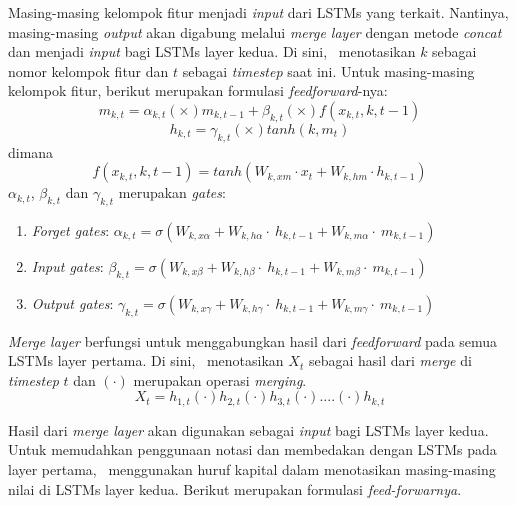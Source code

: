 \begin{enumerate}
	Masing-masing kelompok fitur menjadi \textit{input} dari LSTMs yang terkait. Nantinya, masing-masing \textit{output} akan digabung melalui \textit{merge layer} dengan metode \textit{concat} dan menjadi \textit{input} bagi LSTMs layer kedua.
	Di sini, \saya~menotasikan $ k $ sebagai nomor kelompok fitur dan $ t $ sebagai \textit{timestep} saat ini. Untuk masing-masing kelompok fitur, berikut merupakan formulasi \textit{feedforward}-nya:
	\begin{equation}\label{eq:mt2}
	m_{k,t}=\alpha_{k,t} (\times) m_{k,t-1} + \beta_{k,t} (\times) f(x_{k,t},{k,t-1})
	\end{equation}
	\begin{equation}\label{eq:ht2}
	h_{k,t}=\gamma_{k,t} (\times) tanh(k,m_{t})
	\end{equation}
	dimana
	\begin{equation}\label{eq:hf2}
	f(x_{k,t},{k,t-1})=tanh(W_{k,xm} \cdot x_{t} + W_{k,hm} \cdot h_{k,t-1})
	\end{equation}
	$ \alpha_{k,t} $, $ \beta_{k,t} $ dan $ \gamma_{k,t} $ merupakan \textit{gates}:
	\begin{enumerate}
	\item \textit{Forget gates}: $ \alpha_{k,t}=\sigma(W_{k,x\alpha}+W_{k,h\alpha}\cdot~h_{k,t-1}+W_{k,m\alpha}\cdot~m_{k,t-1}) $
	\item \textit{Input gates}: $ \beta_{k,t}=\sigma(W_{k,x\beta}+W_{k,h\beta}\cdot~h_{k,t-1}+W_{k,m\beta}\cdot~m_{k,t-1}) $
	\item \textit{Output gates}: $ \gamma_{k,t}=\sigma(W_{k,x\gamma}+W_{k,h\gamma}\cdot~h_{k,t-1}+W_{k,m\gamma}\cdot~m_{k,t-1}) $
	\end{enumerate}

	\textit{Merge layer} berfungsi untuk menggabungkan hasil dari \textit{feedforward} pada semua LSTMs layer pertama. Di sini, \saya~menotasikan $ X_t $ sebagai hasil dari \textit{merge} di \textit{timestep} $ t $ dan $ (\cdot) $ merupakan operasi \textit{merging}.
	\begin{equation}\label{eq:merge}
	X_t = h_{1,t} (\cdot) h_{2,t} (\cdot) h_{3,t} (\cdot) .... (\cdot) h_{k,t}
	\end{equation}

	Hasil dari \textit{merge layer} akan digunakan sebagai \textit{input} bagi LSTMs layer kedua. Untuk memudahkan penggunaan notasi dan membedakan dengan LSTMs pada layer pertama, \saya~menggunakan huruf kapital dalam menotasikan masing-masing nilai di LSTMs layer kedua. Berikut merupakan formulasi \textit{feed-forwarnya}.
	

\end{enumerate}
